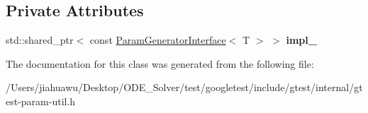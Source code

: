 \subsection*{Private Attributes}
\begin{DoxyCompactItemize}
\item 
\mbox{\label{classtesting_1_1internal_1_1_param_generator_a2ea0b72d470d5a961272c2b818a3f78d}} 
std\+::shared\+\_\+ptr$<$ const \mbox{\hyperlink{classtesting_1_1internal_1_1_param_generator_interface}{Param\+Generator\+Interface}}$<$ T $>$ $>$ {\bfseries impl\+\_\+}
\end{DoxyCompactItemize}


The documentation for this class was generated from the following file\+:\begin{DoxyCompactItemize}
\item 
/\+Users/jiahuawu/\+Desktop/\+O\+D\+E\+\_\+\+Solver/test/googletest/include/gtest/internal/gtest-\/param-\/util.\+h\end{DoxyCompactItemize}
